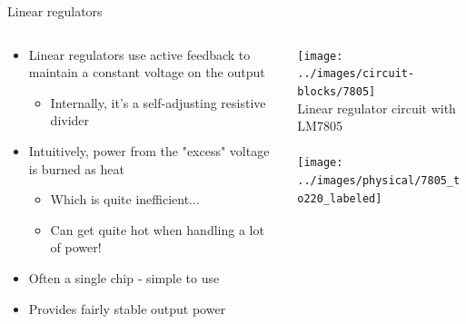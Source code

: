 \documentclass{beamer}
\begin{document}
\begin{frame}{Linear regulators}
  \begin{columns}[T]
    \begin{column}{.6\textwidth}
      \begin{itemize}
        \item Linear regulators use active feedback to maintain a constant voltage on the output
        \begin{itemize}
          \item Internally, it's a self-adjusting resistive divider
        \end{itemize}
        \item Intuitively, power from the "excess" voltage is burned as heat
        \begin{itemize}
          \item Which is quite inefficient...
          \item Can get quite hot when handling a lot of power!
        \end{itemize}        
        \item Often a single chip - simple to use
        \item Provides fairly stable output power
      \end{itemize}
    \end{column}

    \begin{column}{0.4\textwidth} \centering
      \texttt{[image: ../images/circuit-blocks/7805]} \\
      Linear regulator circuit with LM7805\\
      ~ \\
      \texttt{[image: ../images/physical/7805\_to220\_labeled]} \\
    \end{column}
  \end{columns}
\end{frame}
\end{document}
